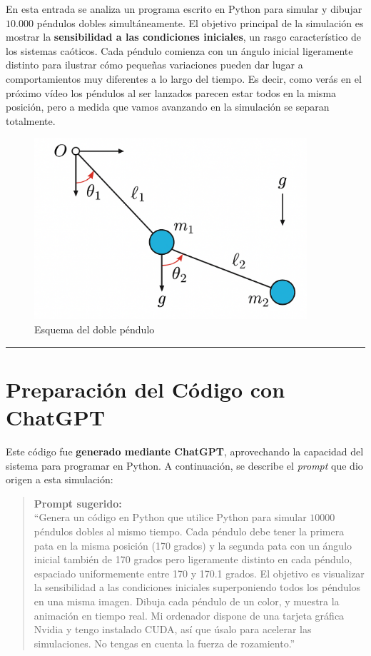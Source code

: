 \documentclass[
  10pt,
  a4paper,
  DIV=11,
  numbers=noendperiod,
  open=any]{scrreprt}
\numberwithin{equation}{chapter}
\numberwithin{equation}{section}
\renewcommand{\[}{\begin{equation}}
\renewcommand{\]}{\end{equation}}
\begin{document}
En esta entrada se analiza un programa escrito en Python para simular y
dibujar \(10.000\) péndulos dobles simultáneamente. El objetivo
principal de la simulación es mostrar la \textbf{sensibilidad a las
condiciones iniciales}, un rasgo característico de los sistemas
caóticos. Cada péndulo comienza con un ángulo inicial ligeramente
distinto para ilustrar cómo pequeñas variaciones pueden dar lugar a
comportamientos muy diferentes a lo largo del tiempo. Es decir, como
verás en el próximo vídeo los péndulos al ser lanzados parecen estar
todos en la misma posición, pero a medida que vamos avanzando en la
simulación se separan totalmente.

\begin{figure}[h]
  \centering
  \includegraphics[width=0.9\textwidth]{02-pendulo-doble/PenduloDoble.png}
  \caption{Esquema del doble péndulo}
\end{figure}

\begin{center}\rule{0.5\linewidth}{0.5pt}\end{center}

\section{Preparación del Código con
ChatGPT}\label{preparaciuxf3n-del-cuxf3digo-con-chatgpt}

Este código fue \textbf{generado mediante ChatGPT}, aprovechando la
capacidad del sistema para programar en Python. A continuación, se
describe el \emph{prompt} que dio origen a esta simulación:

\begin{quote}
\textbf{Prompt sugerido:}\\
``Genera un código en Python que utilice Python para simular \(10000\)
péndulos dobles al mismo tiempo. Cada péndulo debe tener la primera pata
en la misma posición (170 grados) y la segunda pata con un ángulo
inicial también de 170 grados pero ligeramente distinto en cada péndulo,
espaciado uniformemente entre 170 y 170.1 grados. El objetivo es
visualizar la sensibilidad a las condiciones iniciales superponiendo
todos los péndulos en una misma imagen. Dibuja cada péndulo de un color,
y muestra la animación en tiempo real. Mi ordenador dispone de una
tarjeta gráfica Nvidia y tengo instalado CUDA, así que úsalo para
acelerar las simulaciones. No tengas en cuenta la fuerza de
rozamiento.''
\end{quote}
\end{document}
